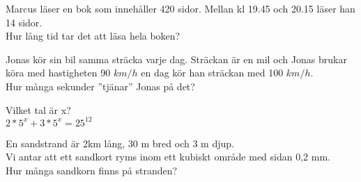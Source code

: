 
\begin{displayquote}
\textcolor{turkos}{Marcus läser en bok som innehåller 420 sidor. Mellan kl 19.45 och 20.15 läser han 14 sidor. \\
Hur lång tid tar det att läsa hela boken?}
\end{displayquote}


\begin{displayquote}
\textcolor{turkos}{Jonas kör sin bil samma sträcka varje dag. Sträckan är en mil och Jonas brukar köra med hastigheten 90 $km/h$ en dag kör han sträckan med 100 $km/h$. \\
Hur många sekunder ''tjänar'' Jonas på det?}
\end{displayquote}



\begin{displayquote}
\textcolor{turkos}{Vilket tal är x?\\
\( 2*5^x + 3*5^x = 25^{12} \)}
\end{displayquote}


\begin{displayquote}
\textcolor{turkos}{En sandstrand är 2km lång, 30 m bred och 3 m djup. \\
Vi antar att ett sandkort ryms inom ett kubiskt område med sidan 0,2 mm.\\
Hur många sandkorn finns på stranden?}
\end{displayquote}


